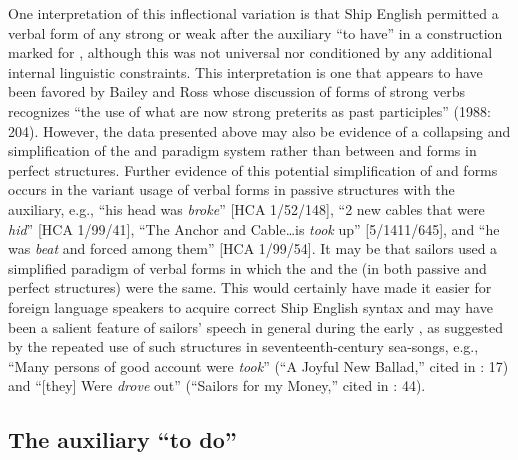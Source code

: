 One interpretation of this inflectional variation is that Ship English permitted a  verbal form of any strong or weak  after the auxiliary “to have” in a construction marked for , although this was not universal nor conditioned by any additional internal linguistic constraints. This interpretation is one that appears to have been favored by Bailey and Ross whose discussion of  forms of strong verbs recognizes “the use of what are now strong preterits as past participles” (1988: 204). However, the data presented above may also be evidence of a collapsing and simplification of the  and  paradigm system rather than  between  and  forms in perfect structures. Further evidence of this potential simplification of  and  forms occurs in the variant usage of verbal forms in passive structures with the  auxiliary, e.g., “his head was \textit{broke}” [HCA 1/52/148], “2 new cables that were \textit{hid}” [HCA 1/99/41], “The Anchor and Cable…is \textit{took} up” [5/1411/645], and “he was \textit{beat} and forced among them” [HCA 1/99/54]. It may be that sailors used a simplified paradigm of verbal forms in which the  and the  (in both passive and perfect structures) were the same. This would certainly have made it easier for foreign language speakers to acquire correct Ship English syntax and may have been a salient feature of sailors’ speech in general during the early , as suggested by the repeated use of such structures in seventeenth-century sea-songs, e.g., “Many persons of good account were \textit{took}” (“A Joyful New Ballad,” cited in \citealt{Palmer1986}: 17) and “[they] Were \textit{drove} out” (“Sailors for my Money,” cited in \citealt{Palmer1986}: 44). 

\subsection{{The auxiliary “to do”}}\label{sec:6.4.2}

